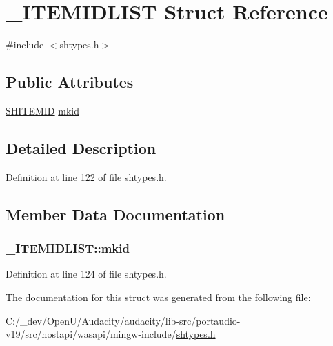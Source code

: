 \hypertarget{struct___i_t_e_m_i_d_l_i_s_t}{}\section{\+\_\+\+I\+T\+E\+M\+I\+D\+L\+I\+ST Struct Reference}
\label{struct___i_t_e_m_i_d_l_i_s_t}


{\ttfamily \#include $<$shtypes.\+h$>$}

\subsection*{Public Attributes}
\begin{DoxyCompactItemize}
\item 
\hyperlink{shtypes_8h_a9fadd0beb7c470635f1e62d6e30c012f}{S\+H\+I\+T\+E\+M\+ID} \hyperlink{struct___i_t_e_m_i_d_l_i_s_t_a0fc918761297b3282aae228e29ecb099}{mkid}
\end{DoxyCompactItemize}


\subsection{Detailed Description}


Definition at line 122 of file shtypes.\+h.



\subsection{Member Data Documentation}
\subsubsection[{\texorpdfstring{mkid}{mkid}}]{ \+\_\+\+I\+T\+E\+M\+I\+D\+L\+I\+S\+T\+::mkid}\hypertarget{struct___i_t_e_m_i_d_l_i_s_t_a0fc918761297b3282aae228e29ecb099}{}\label{struct___i_t_e_m_i_d_l_i_s_t_a0fc918761297b3282aae228e29ecb099}


Definition at line 124 of file shtypes.\+h.



The documentation for this struct was generated from the following file\+:\begin{DoxyCompactItemize}
\item 
C\+:/\+\_\+dev/\+Open\+U/\+Audacity/audacity/lib-\/src/portaudio-\/v19/src/hostapi/wasapi/mingw-\/include/\hyperlink{shtypes_8h}{shtypes.\+h}\end{DoxyCompactItemize}
